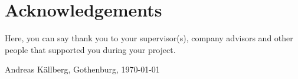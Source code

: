 \thispagestyle{plain}			%
\section*{Acknowledgements}
Here, you can say thank you to your supervisor(s), company advisors and other people that supported you during your project.

\vspace{1.5cm}
\hfill
Andreas Källberg, Gothenburg, \today

\newpage				%
\thispagestyle{empty}
\mbox{}
